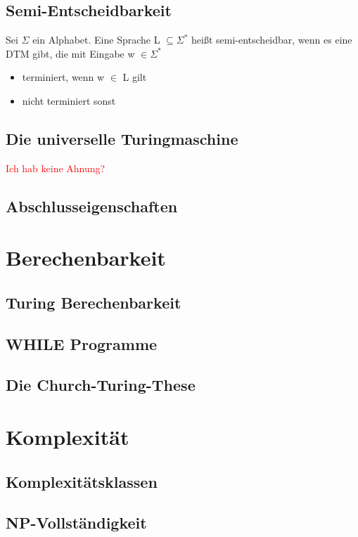 \documentclass[12pt,a4paper]{article}
\begin{document}
	\subsection{Semi-Entscheidbarkeit}
	Sei $\varSigma$ ein Alphabet. Eine Sprache L $\subseteq \varSigma^*$ heißt semi-entscheidbar, wenn es eine DTM gibt, die mit Eingabe w $\in \varSigma^*$ 
	\begin{itemize}
		\item terminiert, wenn w $\in$ L gilt
		\item nicht terminiert sonst
	\end{itemize}

	\subsection{Die universelle Turingmaschine}
	\textcolor{red}{Ich hab keine Ahnung?}

	\subsection{Abschlusseigenschaften}

\section{Berechenbarkeit}
	\subsection{Turing Berechenbarkeit}

	\subsection{WHILE Programme}

	\subsection{Die Church-Turing-These}

\section{Komplexität}
	\subsection{Komplexitätsklassen}

	\subsection{NP-Vollständigkeit}
\end{document}
